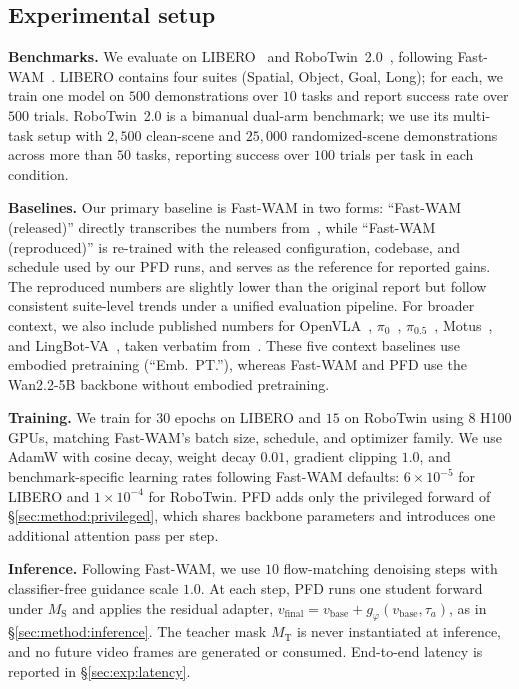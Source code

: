 \documentclass{article}
\begin{document}
\subsection{Experimental setup}
\label{sec:exp:setup}
\noindent\textbf{Benchmarks.}
We evaluate on LIBERO~\citep{liu2023libero} and RoboTwin~2.0~\citep{mu2025robotwin}, following Fast-WAM~\citep{yuan2026fastwam}. LIBERO contains four suites (Spatial, Object, Goal, Long); for each, we train one model on $500$ demonstrations over $10$ tasks and report success rate over $500$ trials. RoboTwin~2.0 is a bimanual dual-arm benchmark; we use its multi-task setup with $2{,}500$ clean-scene and $25{,}000$ randomized-scene demonstrations across more than $50$ tasks, reporting success over $100$ trials per task in each condition.

\noindent\textbf{Baselines.}
Our primary baseline is Fast-WAM in two forms: ``Fast-WAM (released)'' directly transcribes the numbers from~\citet{yuan2026fastwam}, while ``Fast-WAM (reproduced)'' is re-trained with the released configuration, codebase, and schedule used by our PFD runs, and serves as the reference for reported gains. The reproduced numbers are slightly lower than the original report but follow consistent suite-level trends under a unified evaluation pipeline. For broader context, we also include published numbers for OpenVLA~\citep{kim2024openvla}, $\pi_0$~\citep{black2024pi0}, $\pi_{0.5}$~\citep{intelligence2025pi05}, Motus~\citep{motus2025}, and LingBot-VA~\citep{lingbotva2025}, taken verbatim from~\citet{yuan2026fastwam}. These five context baselines use embodied pretraining (``Emb.\ PT.''), whereas Fast-WAM and PFD use the Wan2.2-5B backbone without embodied pretraining.

\noindent\textbf{Training.}
We train for $30$ epochs on LIBERO and $15$ on RoboTwin using $8$ H100 GPUs, matching Fast-WAM's batch size, schedule, and optimizer family. We use AdamW with cosine decay, weight decay $0.01$, gradient clipping $1.0$, and benchmark-specific learning rates following Fast-WAM defaults: $6{\times}10^{-5}$ for LIBERO and $1{\times}10^{-4}$ for RoboTwin. PFD adds only the privileged forward of \S\ref{sec:method:privileged}, which shares backbone parameters and introduces one additional attention pass per step.

\noindent\textbf{Inference.}
Following Fast-WAM, we use $10$ flow-matching denoising steps with classifier-free guidance scale $1.0$. At each step, PFD runs one student forward under $M_\mathrm{S}$ and applies the residual adapter,
$v_\mathrm{final}=v_\mathrm{base}+g_\varphi(v_\mathrm{base},\tau_a)$,
as in \S\ref{sec:method:inference}. The teacher mask $M_\mathrm{T}$ is never instantiated at inference, and no future video frames are generated or consumed. End-to-end latency is reported in \S\ref{sec:exp:latency}.
\end{document}
